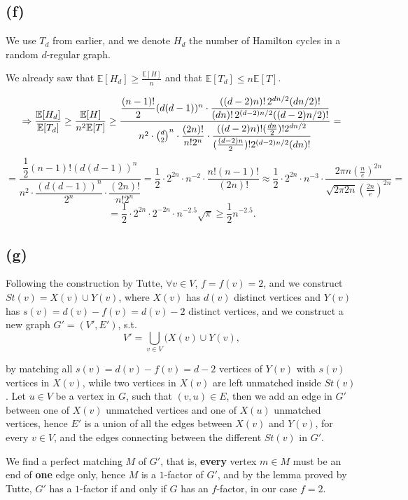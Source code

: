 \documentclass{article}
\begin{document}
\subsection*{(f)}
We use $T_d$ from earlier, and we denote $H_d$ the number of Hamilton cycles in a random $d$-regular graph. 

We already saw that $\mathbb{E}[H_d]\geq\frac{\mathbb{E}[H]}{n}$ and that $\mathbb{E}[T_d]\leq{n\mathbb{E}[T]}$.

\[\Rightarrow\frac{\mathbb{E}[H_d]}{\mathbb{E}[T_d]}\geq
\frac{\mathbb{E}[H]}{n^2 \mathbb{E}[T]} \\[2mm]
\geq
\frac{
\dfrac{(n-1)!}{2} (d(d-1))^n \cdot
\dfrac{((d-2)n)! \, 2^{dn/2} (dn/2)!}{(dn)! \, 2^{(d-2)n/2} ((d-2)n/2)!}
}{
n^2 \cdot \binom{d}{2}^n \cdot 
\dfrac{(2n)!}{n! 2^n} \cdot 
\dfrac{((d-2)n)! (\tfrac{dn}{2})! 2^{dn/2}}{(\tfrac{(d-2)n}{2})! 2^{(d-2)n/2} (dn)!}
}
=\]\[=
\frac{
\dfrac{1}{2} (n-1)! (d(d-1))^n
}{
n^2 \cdot \dfrac{(d(d-1))^n}{2^n} \cdot \dfrac{(2n)!}{n! 2^n}
}
=\frac{1}{2}\cdot2^{2n}\cdot n^{-2}\cdot\frac{n!(n-1)!}{(2n)!
}
\approx\frac{1}{2}\cdot2^{2n}\cdot n^{-3}\cdot\frac{2\pi n(\frac{n}{e})^{2n}}{\sqrt{2\pi 2n}(\frac{2n}{e})^{2n}
}
=\]\[=\frac{1}{2}\cdot2^{2n}\cdot2^{-2n}\cdot n^{-2.5}\sqrt{\pi
}
\geq\frac{1}{2} n^{-2.5}.\]

\subsection*{(g)}
Following the construction by Tutte, $\forall{v}\in{V}$, $f=f(v)=2$, and we construct $St(v)=X(v)\cup{Y}(v)$, where $X(v)$ has $d(v)$ distinct vertices and $Y(v)$ has $s(v)=d(v)-f(v)=d(v)-2$ distinct vertices, and we construct a new graph $G'=(V',E')$, s.t. \[V'=\bigcup_{v\in{V}}(X(v)\cup{Y}(v),\] 

by matching all $s(v)=d(v)-f(v)=d-2$ vertices of $Y(v)$ with $s(v)$ vertices in $X(v)$, while two vertices in $X(v)$ are left unmatched inside $St(v)$. Let $u\in{V}$ be a vertex in $G$, such that $(v,u)\in{E}$, then we add an edge in $G'$ between one of $X(v)$ unmatched vertices and one of $X(u)$ unmatched vertices, hence $E'$ is a union of all the edges between $X(v)$ and $Y(v)$, for every $v\in{V}$, and the edges connecting between the different $St(v)$ in $G'$.

We find a perfect matching $M$ of $G'$, that is, \textbf{every} vertex $m\in{M}$ must be an end of \textbf{one} edge only, hence $M$ is a $1$-factor of $G'$, and by the lemma proved by Tutte, $G'$ has a $1$-factor if and only if $G$ has an $f$-factor, in our case $f=2$.
\end{document}
